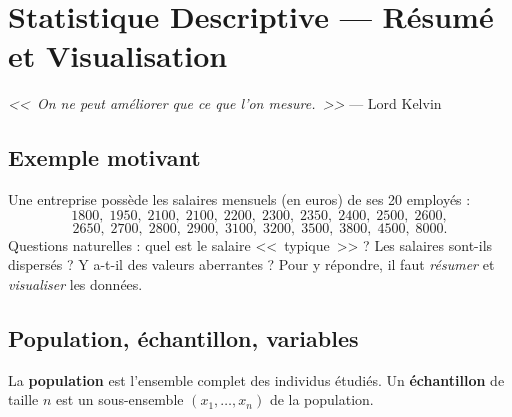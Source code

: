 \chapter{Statistique Descriptive --- R\'esum\'e et Visualisation}
\label{ch:descriptive}

\begin{center}
\textit{<<~On ne peut am\'eliorer que ce que l'on mesure.~>>} --- Lord Kelvin
\end{center}

\section{Exemple motivant}

Une entreprise poss\`ede les salaires mensuels (en euros) de ses 20 employ\'es :
\[
1800,\; 1950,\; 2100,\; 2100,\; 2200,\; 2300,\; 2350,\; 2400,\; 2500,\; 2600,
\]
\[
2650,\; 2700,\; 2800,\; 2900,\; 3100,\; 3200,\; 3500,\; 3800,\; 4500,\; 8000.
\]
Questions naturelles : quel est le salaire <<~typique~>> ? Les salaires sont-ils dispers\'es ? Y a-t-il des valeurs aberrantes ? Pour y r\'epondre, il faut \emph{r\'esumer} et \emph{visualiser} les donn\'ees.

\section{Population, \'echantillon, variables}

\begin{definition}
La \textbf{population} est l'ensemble complet des individus \'etudi\'es. Un \textbf{\'echantillon} de taille $n$ est un sous-ensemble $(x_1,\ldots,x_n)$ de la population.
\end{definition}


